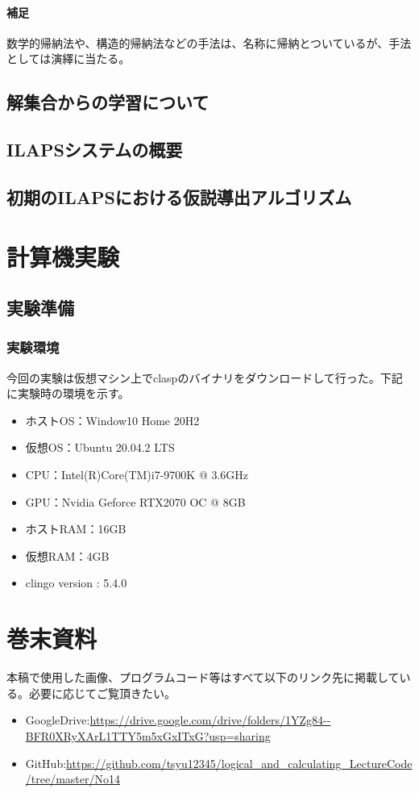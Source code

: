 \documentclass[dvipdfmx]{jsarticle}
\begin{document}
\paragraph{補足}数学的帰納法や、構造的帰納法などの手法は、名称に帰納とついているが、手法としては演繹に当たる。
\subsection{解集合からの学習について}
\subsection{ILAPSシステムの概要}
\subsection{初期のILAPSにおける仮説導出アルゴリズム}

\section{計算機実験}
\subsection{実験準備}
  \subsubsection{実験環境}
  今回の実験は仮想マシン上でclaspのバイナリをダウンロードして行った。下記に実験時の環境を示す。
  \begin{itemize}
    \item ホストOS：Window10 Home 20H2
    \item 仮想OS：Ubuntu 20.04.2 LTS
    \item CPU：Intel(R)Core(TM)i7-9700K @ 3.6GHz
    \item GPU：Nvidia Geforce RTX2070 OC @ 8GB
    \item ホストRAM：16GB
    \item 仮想RAM：4GB
    \item clingo version : 5.4.0
  \end{itemize}

\section{巻末資料}
  本稿で使用した画像、プログラムコード等はすべて以下のリンク先に掲載している。必要に応じてご覧頂きたい。
  \begin{itemize}
    \item GoogleDrive:\url{https://drive.google.com/drive/folders/1YZg84--BFR0XRyXArL1TTY5m5xGxITxG?usp=sharing}
    \item GitHub:\url{https://github.com/tsyu12345/logical_and_calculating_LectureCode/tree/master/No14}
  \end{itemize}
\end{document}
